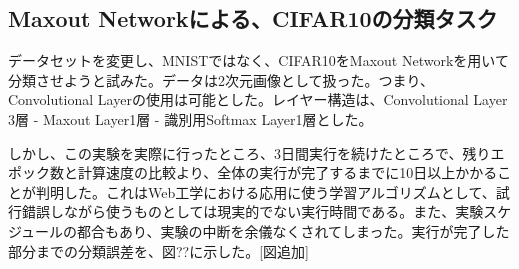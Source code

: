 \subsection{Maxout Networkによる、CIFAR10の分類タスク}
データセットを変更し、MNISTではなく、CIFAR10をMaxout Networkを用いて分類させようと試みた。データは2次元画像として扱った。つまり、Convolutional Layerの使用は可能とした。レイヤー構造は、Convolutional Layer 3層 - Maxout Layer1層 - 識別用Softmax Layer1層とした。\par
しかし、この実験を実際に行ったところ、3日間実行を続けたところで、残りエポック数と計算速度の比較より、全体の実行が完了するまでに10日以上かかることが判明した。これはWeb工学における応用に使う学習アルゴリズムとして、試行錯誤しながら使うものとしては現実的でない実行時間である。また、実験スケジュールの都合もあり、実験の中断を余儀なくされてしまった。実行が完了した部分までの分類誤差を、図??に示した。[図追加]